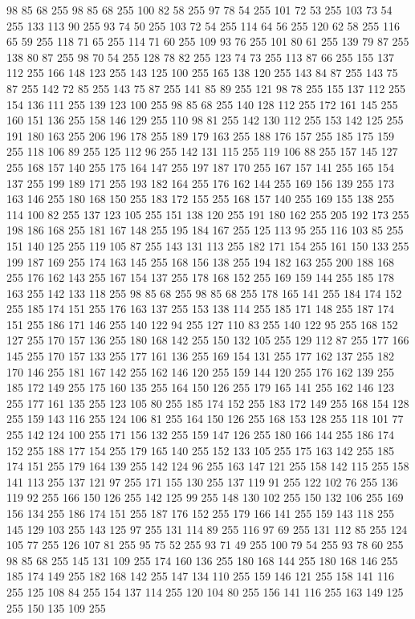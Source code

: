 98 85 68 255 98 85 68 255 100 82 58 255 97 78 54 255 101 72 53 255 103 73 54 255 133 113 90 255 93 74 50 255 103 72 54 255 114 64 56 255 120 62 58 255 116 65 59 255 118 71 65 255 114 71 60 255 109 93 76 255 101 80 61 255 139 79 87 255 138 80 87 255 98 70 54 255 128 78 82 255 123 74 73 255 113 87 66 255 155 137 112 255 166 148 123 255 143 125 100 255 165 138 120 255 143 84 87 255 143 75 87 255 142 72 85 255 143 75 87 255 141 85 89 255 121 98 78 255 155 137 112 255 154 136 111 255 139 123 100 255 98 85 68 255 140 128 112 255 172 161 145 255 160 151 136 255 158 146 129 255 110 98 81 255 142 130 112 255 153 142 125 255 191 180 163 255 206 196 178 255 189 179 163 255 188 176 157 255 185 175 159 255 118 106 89 255 125 112 96 255 142 131 115 255 119 106 88 255 157 145 127 255 168 157 140 255 175 164 147 255 197 187 170 255 167 157 141 255 165 154 137 255 199 189 171 255 193 182 164 255 176 162 144 255 169 156 139 255 173 163 146 255 180 168 150 255
183 172 155 255 168 157 140 255 169 155 138 255 114 100 82 255 137 123 105 255 151 138 120 255 191 180 162 255 205 192 173 255 198 186 168 255 181 167 148 255 195 184 167 255 125 113 95 255 116 103 85 255 151 140 125 255 119 105 87 255 143 131 113 255 182 171 154 255 161 150 133 255 199 187 169 255 174 163 145 255 168 156 138 255 194 182 163 255 200 188 168 255 176 162 143 255 167 154 137 255 178 168 152 255 169 159 144 255 185 178 163 255 142 133 118 255 98 85 68 255 98 85 68 255 178 165 141 255 184 174 152 255 185 174 151 255 176 163 137 255 153 138 114 255 185 171 148 255 187 174 151 255 186 171 146 255 140 122 94 255 127 110 83 255 140 122 95 255 168 152 127 255 170 157 136 255 180 168 142 255 150 132 105 255 129 112 87 255 177 166 145 255 170 157 133 255 177 161 136 255 169 154 131 255 177 162 137 255 182 170 146 255 181 167 142 255 162 146 120 255 159 144 120 255 176 162 139 255 185 172 149 255 175 160 135 255 164 150 126 255 179 165 141 255 162 146 123 255 177 161 135 255 123 105 80 255
185 174 152 255 183 172 149 255 168 154 128 255 159 143 116 255 124 106 81 255 164 150 126 255 168 153 128 255 118 101 77 255 142 124 100 255 171 156 132 255 159 147 126 255 180 166 144 255 186 174 152 255 188 177 154 255 179 165 140 255 152 133 105 255 175 163 142 255 185 174 151 255 179 164 139 255 142 124 96 255 163 147 121 255 158 142 115 255 158 141 113 255 137 121 97 255 171 155 130 255 137 119 91 255 122 102 76 255 136 119 92 255 166 150 126 255 142 125 99 255 148 130 102 255 150 132 106 255 169 156 134 255 186 174 151 255 187 176 152 255 179 166 141 255 159 143 118 255 145 129 103 255 143 125 97 255 131 114 89 255 116 97 69 255 131 112 85 255 124 105 77 255 126 107 81 255 95 75 52 255 93 71 49 255 100 79 54 255 93 78 60 255 98 85 68 255 145 131 109 255 174 160 136 255 180 168 144 255 180 168 146 255 185 174 149 255 182 168 142 255 147 134 110 255 159 146 121 255 158 141 116 255 125 108 84 255 154 137 114 255 120 104 80 255 156 141 116 255 163 149 125 255 150 135 109 255
